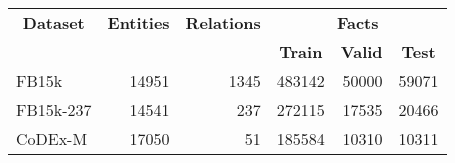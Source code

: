 \begin{tabular}{| l | r | r | r | r | r |}
    \hline

    \multicolumn{1}{|c|}{\textbf{Dataset}} &
    \multicolumn{1}{|c|}{\textbf{Entities}} &
    \multicolumn{1}{|c|}{\textbf{Relations}} &
    \multicolumn{3}{|c|}{\textbf{Facts}} \\

    \multicolumn{1}{|c|}{} &
    \multicolumn{1}{|c|}{} &
    \multicolumn{1}{|c|}{} &
    \multicolumn{1}{|c|}{\textbf{Train}} &
    \multicolumn{1}{|c|}{\textbf{Valid}} &
    \multicolumn{1}{|c|}{\textbf{Test}} \\

    \hline \hline

    FB15k     & \num{14951} & \num{1345} & \num{483142} & \num{50000} & \num{59071} \\
    FB15k-237 & \num{14541} & \num{237}  & \num{272115} & \num{17535} & \num{20466} \\
    CoDEx-M   & \num{17050} & \num{51}   & \num{185584} & \num{10310} & \num{10311} \\

    \hline
\end{tabular}
